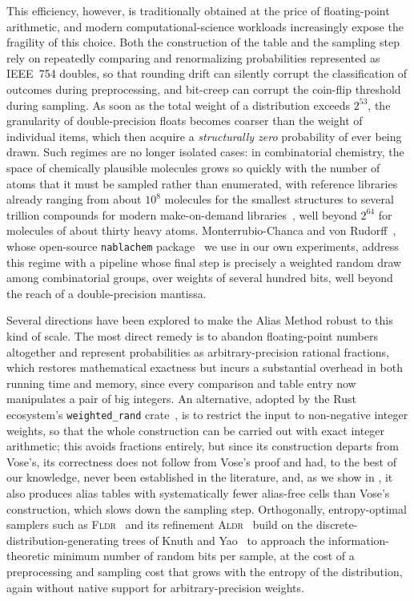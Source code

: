 This efficiency, however, is traditionally obtained at the price of floating-point arithmetic, and modern
computational-science workloads increasingly expose the fragility of this choice. Both the construction of
the table and the sampling step rely on repeatedly comparing and renormalizing probabilities represented as
IEEE~754 doubles, so that rounding drift can silently corrupt the classification of outcomes during
preprocessing, and bit-creep can corrupt the coin-flip threshold during sampling. As soon as the total
weight of a distribution exceeds $2^{53}$, the granularity of double-precision floats becomes coarser than
the weight of individual items, which then acquire a \emph{structurally zero} probability of ever being
drawn. Such regimes are no longer isolated cases: in combinatorial chemistry, the space of chemically
plausible molecules grows so quickly with the number of atoms that it must be sampled rather than
enumerated, with reference libraries already ranging from about $10^{8}$ molecules for the smallest
structures to several trillion compounds for modern make-on-demand libraries~\cite{SSHL26}, well beyond
$2^{64}$ for molecules of about thirty heavy atoms. Monterrubio-Chanca and von Rudorff~\cite{MR25}, whose
open-source \texttt{nablachem} package~\cite{nablachem} we use in our own experiments, address this regime
with a pipeline whose final step is precisely a weighted random draw among combinatorial groups, over
weights of several hundred bits, well beyond the reach of a double-precision mantissa.

Several directions have been explored to make the Alias Method robust to this kind of scale. The most
direct remedy is to abandon floating-point numbers altogether and represent probabilities as
arbitrary-precision rational fractions, which restores mathematical exactness but incurs a substantial
overhead in both running time and memory, since every comparison and table entry now manipulates a pair of
big integers. An alternative, adopted by the Rust ecosystem's \texttt{weighted\_rand} crate~\cite{Rust25},
is to restrict the input to non-negative integer weights, so that the whole construction can be carried out
with exact integer arithmetic; this avoids fractions entirely, but since its construction departs from Vose's, its correctness does not
follow from Vose's proof and had, to the best of our knowledge, never been established in the literature, and, as we show in , it also produces
alias tables with systematically fewer alias-free cells than Vose's construction, which slows down the
sampling step. Orthogonally, entropy-optimal samplers such as \textsc{Fldr}~\cite{SFRM19} and its
refinement \textsc{Aldr}~\cite{DS26} build on the discrete-distribution-generating trees of Knuth and
Yao~\cite{KY76} to approach the information-theoretic minimum number of random bits per sample, at the cost
of a preprocessing and sampling cost that grows with the entropy of the distribution, again without native
support for arbitrary-precision weights.

